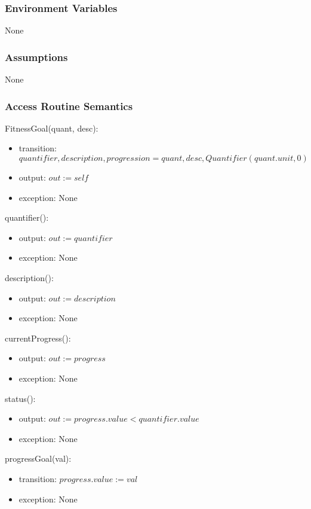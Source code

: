 \documentclass[12pt, titlepage]{article}
\begin{document}
\subsubsection{Environment Variables}
None
\subsubsection{Assumptions}
None
\subsubsection{Access Routine Semantics}

\newpage

\noindent FitnessGoal(quant, desc):
\begin{itemize}
	\item transition: $quantifier, description, progression = quant, desc, Quantifier(quant.unit, 0)$
	\item output: $out := self$
	\item exception: None
\end{itemize}

\noindent quantifier():
\begin{itemize}
	\item output: $out := quantifier$
	\item exception: None
\end{itemize}

\noindent description():
\begin{itemize}
	\item output: $out := description$
	\item exception: None
\end{itemize}

\noindent currentProgress():
\begin{itemize}
	\item output: $out := progress$
	\item exception: None
\end{itemize}

\noindent status():
\begin{itemize}
	\item output: $out := progress.value < quantifier.value $
	\item exception: None
\end{itemize}

\noindent progressGoal(val):
\begin{itemize}
	\item transition: $progress.value := val$
	\item exception: None
\end{itemize}
\end{document}
